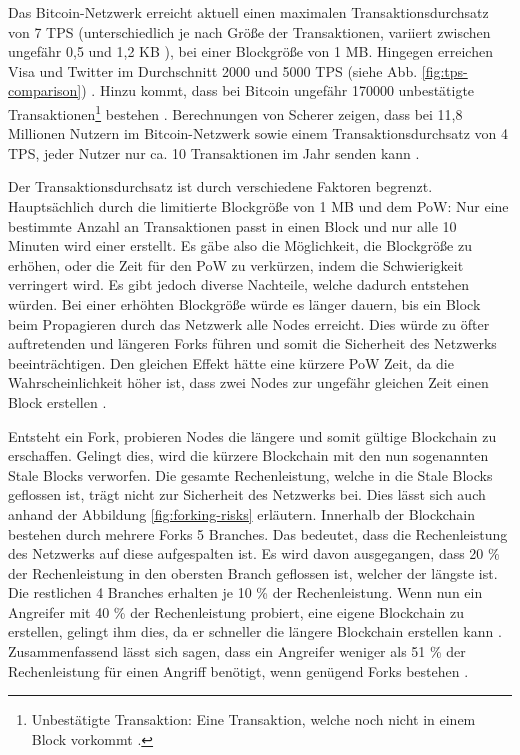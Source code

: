 Das Bitcoin-Netzwerk erreicht aktuell einen maximalen Transaktionsdurchsatz von 7 \acs{TPS} (unterschiedlich je nach Größe der Transaktionen, variiert zwischen ungefähr 0,5 und 1,2 KB \cite{Bitcoin.comTeamBitcoinTransactionSize}), bei einer Blockgröße von 1 MB. Hingegen erreichen Visa und Twitter im Durchschnitt 2000 und 5000 \acs{TPS} (siehe Abb. \ref{fig:tps-comparison}) \cite[S.~28]{SwanBlockchainblueprintnew2015}. Hinzu kommt, dass bei Bitcoin ungefähr 170000 unbestätigte Transaktionen\footnote{Unbestätigte Transaktion: Eine Transaktion, welche noch nicht in einem Block vorkommt \cite[S.~13 ff.]{AntonopoulosMasteringbitcoin2015}.} bestehen \cite{BlockchainUnternehmenUnbestatigteTransaktionenBitcoin}. Berechnungen von Scherer zeigen, dass bei 11,8 Millionen Nutzern im Bitcoin-Netzwerk sowie einem Transaktionsdurchsatz von 4 \acs{TPS}, jeder Nutzer nur ca. 10 Transaktionen im Jahr senden kann \cite{SchererPerformanceScalabilityBlockchain2017}.

Der Transaktionsdurchsatz ist durch verschiedene Faktoren begrenzt. Hauptsächlich durch die limitierte Blockgröße von 1 MB und dem \acs{PoW}: Nur eine bestimmte Anzahl an Transaktionen passt in einen Block und nur alle 10 Minuten wird einer erstellt. Es gäbe also die Möglichkeit, die Blockgröße zu erhöhen, oder die Zeit für den \acs{PoW} zu verkürzen, indem die Schwierigkeit verringert wird. Es gibt jedoch diverse Nachteile, welche dadurch entstehen würden. Bei einer erhöhten Blockgröße würde es länger dauern, bis ein Block beim Propagieren durch das Netzwerk alle Nodes erreicht. Dies würde zu öfter auftretenden und längeren Forks führen und somit die Sicherheit des Netzwerks beeinträchtigen. Den gleichen Effekt hätte eine kürzere \acs{PoW} Zeit, da die Wahrscheinlichkeit höher ist, dass zwei Nodes zur ungefähr gleichen Zeit einen Block erstellen \cite{SchererPerformanceScalabilityBlockchain2017}\cite{EthereumTeamEthereumWhitePaper2017}\cite{SompolinskyAcceleratingBitcoinTransaction2013}. 

Entsteht ein Fork, probieren Nodes die längere und somit gültige Blockchain zu erschaffen. Gelingt dies, wird die kürzere Blockchain mit den nun sogenannten Stale Blocks verworfen. Die gesamte Rechenleistung, welche in die Stale Blocks geflossen ist, trägt nicht zur Sicherheit des Netzwerks bei. Dies lässt sich auch anhand der Abbildung \ref{fig:forking-risks} erläutern. Innerhalb der Blockchain bestehen durch mehrere Forks 5 Branches. Das bedeutet, dass die Rechenleistung des Netzwerks auf diese aufgespalten ist. Es wird davon ausgegangen, dass 20 \% der Rechenleistung in den obersten Branch geflossen ist, welcher der längste ist. Die restlichen 4 Branches erhalten je 10 \% der Rechenleistung. Wenn nun ein Angreifer mit 40 \% der Rechenleistung probiert, eine eigene Blockchain zu erstellen, gelingt ihm dies, da er schneller die längere Blockchain erstellen kann \cite{SompolinskyAcceleratingBitcoinTransaction2013}. Zusammenfassend lässt sich sagen, dass ein Angreifer weniger als 51 \% der Rechenleistung für einen Angriff benötigt, wenn genügend Forks bestehen \cite{Buterin12secondBlockTime2014}. 

